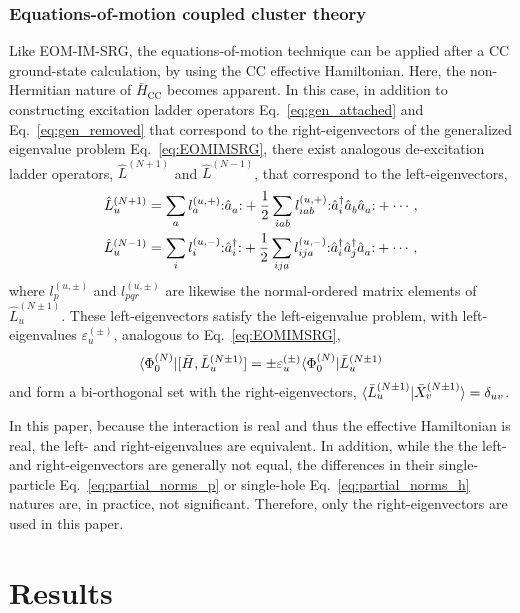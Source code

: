 \subsubsection*{Equations-of-motion coupled cluster theory}

Like EOM-IM-SRG, the equations-of-motion technique can be applied after a CC ground-state calculation, by using the CC effective Hamiltonian.  Here, the non-Hermitian nature of $\bar{H}_{\mathrm{CC}}$ becomes apparent.  In this case, in addition to constructing excitation ladder operators Eq.\ \eqref{eq:gen_attached} and Eq.\ \eqref{eq:gen_removed} that correspond to the right-eigenvectors of the generalized eigenvalue problem Eq.\ \eqref{eq:EOMIMSRG}, there exist analogous de-excitation ladder operators, $\hat{L}^{(N + 1)}$ and $\hat{L}^{(N - 1)}$, that correspond to the left-eigenvectors,
\begin{align*}
    \hat{L}^{(N + 1)}_u &= \sum_a l^{(u, +)}_a \mathopen: \hat{a}_a^{} \mathclose: + \frac{1}{2} \sum_{i a b} l^{(u, +)}_{i a b} \mathopen: \hat{a}^\dagger_i \hat{a}_b^{} \hat{a}_a^{} \mathclose: + \cdots, \\
    \hat{L}^{(N - 1)}_u &= \sum_i l_i^{(u, -)} \mathopen: \hat{a}^\dagger_i \mathclose: + \frac{1}{2} \sum_{i j a} l^{(u, -)}_{i j a} \mathopen: \hat{a}^\dagger_i \hat{a}^\dagger_j \hat{a}_a^{} \mathclose: + \cdots,
\end{align*}
where $l^{(u, \pm)}_p$ and $l^{(u, \pm)}_{p q r}$ are likewise the normal-ordered matrix elements of $\hat{L}^{(N \pm 1)}_u$.  These left-eigenvectors satisfy the left-eigenvalue problem, with left-eigenvalues $\varepsilon^{(\pm)}_u$, analogous to Eq.\ \eqref{eq:EOMIMSRG},
\begin{align*}
  \langle \Phi^{(N)}_0 | [\bar{H}, \bar{L}^{(N \pm 1)}_u] = \pm \varepsilon^{(\pm)}_u \langle \Phi^{(N)}_0 | \bar{L}^{(N \pm 1)}_u
\end{align*}
and form a bi-orthogonal set with the right-eigenvectors, $\langle \bar{L}^{(N \pm 1)}_u | \bar{X}^{(N \pm 1)}_v\rangle = \delta_{u v}$.

In this paper, because the interaction is real and thus the effective Hamiltonian is real, the left- and right-eigenvalues are equivalent. In addition, while the the left- and right-eigenvectors are generally not equal, the differences in their single-particle Eq.\ \eqref{eq:partial_norms_p} or single-hole Eq.\ \eqref{eq:partial_norms_h} natures are, in practice, not significant.  Therefore, only the right-eigenvectors are used in this paper.

\section{Results}
\label{sec:results}

